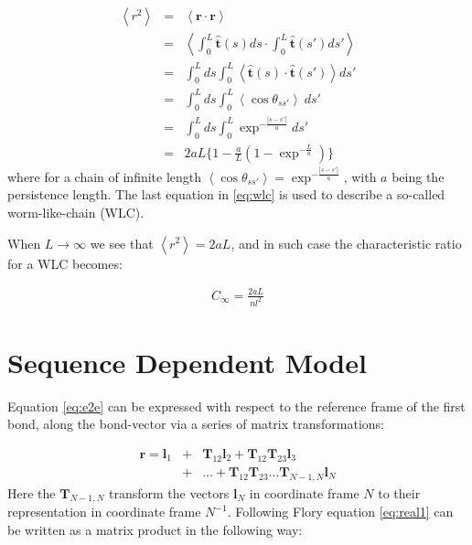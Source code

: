 \begin{eqnarray}
\label{eq:wlc}
\left<r^2\right> & = & \left<\textbf{r} \cdot \textbf{r}\right> \nonumber \\
               & = & \left<\int_{0}^{L}\hat{\textbf{t}}(s)ds \cdot \int_{0}^{L}\hat{\textbf{t}}(s')ds' \right>\nonumber \\
               & = & \int_{0}^{L} ds \int_{0}^{L} \left<\hat{\textbf{t}}(s) \cdot \hat{\textbf{t}}(s')\right>ds' \nonumber \\
               & = & \int_{0}^{L} ds \int_{0}^{L} \left<\cos{\theta}_{ss'}\right>~ ds' \nonumber \\
               & = & \int_{0}^{L} ds \int_{0}^{L} \exp^{-\frac{|s-s'|}{a}} ds' \nonumber \\
               & = & 2aL \{ 1 - \frac{a}{L}(1-\exp^{-\frac{L}{a}})\}
\end{eqnarray}
where for a  chain of infinite length $\left<\cos{\theta_{ss'}}\right>
=  \exp^{-\frac{|s-s'|}{a}}$, with $a$  being the  persistence length.
The  last equation  in \ref{eq:wlc}  is used  to describe  a so-called
worm-like-chain (WLC).

When $L \to \infty$ we see that $\left<r^{2}\right>=2aL$, and in such
case the characteristic ratio for a WLC becomes:

\begin{gather}
C_{\infty}=\frac{2aL}{nl^{2}}  
\end{gather}  

\section{Sequence Dependent Model}
Equation \ref{eq:e2e} can be expressed with respect to the reference
frame of the first bond, along  the bond-vector via a series of matrix
transformations: 

\begin{eqnarray}
\label{eq:real1}  
\mathbf{r} = \mathbf{l}_{1} & + & \mathbf{T}_{12}\mathbf{l}_{2}
+\mathbf{T}_{12}\mathbf{T}_{23}\mathbf{l}_{3} \nonumber \\
 & + & ... + \mathbf{T}_{12}\mathbf{T}_{23}...\mathbf{T}_{N-1,N} \mathbf{l}_{N}
\end{eqnarray}
Here the  $\mathbf{T}_{N-1,N}$ transform the  vectors $\mathbf{l}_{N}$
in coordinate  frame $N$ to  their representation in  coordinate frame
$N^{-1}$.   Following Flory  \cite{flory1969}  equation \ref{eq:real1}
can be written as a matrix product in the following way:

